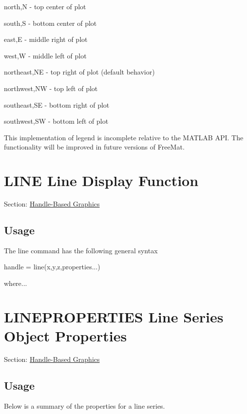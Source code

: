 \begin{DoxyItemize}
\item {\ttfamily north},{\ttfamily N} -\/ top center of plot  
\item {\ttfamily south},{\ttfamily S} -\/ bottom center of plot  
\item {\ttfamily east},{\ttfamily E} -\/ middle right of plot  
\item {\ttfamily west},{\ttfamily W} -\/ middle left of plot  
\item {\ttfamily northeast},{\ttfamily N\-E} -\/ top right of plot (default behavior)  
\item {\ttfamily northwest},{\ttfamily N\-W} -\/ top left of plot  
\item {\ttfamily southeast},{\ttfamily S\-E} -\/ bottom right of plot  
\item {\ttfamily southwest},{\ttfamily S\-W} -\/ bottom left of plot  
\end{DoxyItemize}This implementation of {\ttfamily legend} is incomplete relative to the M\-A\-T\-L\-A\-B A\-P\-I. The functionality will be improved in future versions of Free\-Mat. \hypertarget{handle_line}{}\section{L\-I\-N\-E Line Display Function}\label{handle_line}
Section\-: \hyperlink{sec_handle}{Handle-\/\-Based Graphics} \hypertarget{vtkwidgets_vtkxyplotwidget_Usage}{}\subsection{Usage}\label{vtkwidgets_vtkxyplotwidget_Usage}
The {\ttfamily line} command has the following general syntax \begin{DoxyVerb}   handle = line(x,y,z,properties...)
\end{DoxyVerb}
 where... \hypertarget{handle_lineproperties}{}\section{L\-I\-N\-E\-P\-R\-O\-P\-E\-R\-T\-I\-E\-S Line Series Object Properties}\label{handle_lineproperties}
Section\-: \hyperlink{sec_handle}{Handle-\/\-Based Graphics} \hypertarget{vtkwidgets_vtkxyplotwidget_Usage}{}\subsection{Usage}\label{vtkwidgets_vtkxyplotwidget_Usage}
Below is a summary of the properties for a line series. 
